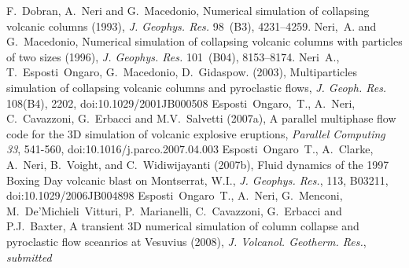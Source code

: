 \documentclass[11pt]{article}
\begin{document}
%

%




\newpage


\newpage


\newpage


\newpage


\newpage


\newpage
{}
\begin{thebibliography}{10}
F.~Dobran, A.~Neri and G.~Macedonio, Numerical simulation of collapsing volcanic columns (1993), {\em J. Geophys. Res.} 98~(B3), 4231--4259. 
Neri,~A. and G.~Macedonio, Numerical simulation of collapsing volcanic columns with particles of two sizes (1996), {\em J. Geophys. Res.} 101~(B04), 8153--8174.
Neri~A., T.~Esposti~Ongaro, G.~Macedonio, D.~Gidaspow. (2003),
Multiparticles simulation of collapsing volcanic columns and pyroclastic
flows, {\em J. Geoph. Res.} 108(B4), 2202, doi:10.1029/2001JB000508
Esposti~Ongaro,~T., A.~Neri, C.~Cavazzoni, G.~Erbacci and M.V.~Salvetti (2007a),
A parallel multiphase flow code for the 3D simulation of volcanic explosive eruptions, {\em Parallel Computing 33}, 541-560, doi:10.1016/j.parco.2007.04.003
Esposti~Ongaro~T., A.~Clarke, A.~Neri, B.~Voight, and C.~Widiwijayanti (2007b), Fluid dynamics of the 1997 Boxing Day volcanic blast on Montserrat, W.I., {\em J. Geophys. Res.}, 113, B03211, doi:10.1029/2006JB004898
Esposti~Ongaro~T., A.~Neri, G.~Menconi, M.~De'Michieli~Vitturi, P.~Marianelli, C.~Cavazzoni, G.~Erbacci and P.J.~Baxter, A transient 3D numerical simulation of column collapse and pyroclastic flow sceanrios at Vesuvius (2008), {\em J. Volcanol. Geotherm. Res.}, {\it submitted}
\end{thebibliography}

\newpage
{}
\printindex

\end{document}
